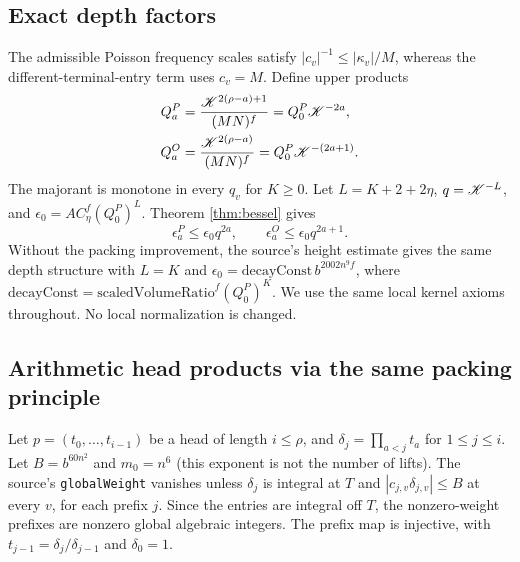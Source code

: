 \documentclass[11pt,a4paper]{article}
\begin{document}
\subsection{Exact depth factors}
The admissible Poisson frequency scales satisfy $|c_v|^{-1}\leq |\kappa_v|/M$, whereas the different-terminal-entry term uses $c_v=M$. Define upper products
\begin{align}
Q_a^P&=\frac{\mathscr K^{2(\rho-a)+1}}{(MN)^f}=Q_0^P\mathscr K^{-2a},\\
Q_a^O&=\frac{\mathscr K^{2(\rho-a)}}{(MN)^f}=Q_0^P\mathscr K^{-(2a+1)}.
\end{align}
The majorant is monotone in every $q_v$ for $K\geq0$. Let $L=K+2+2\eta$, $q=\mathscr K^{-L}$, and $\epsilon_0=A C_\eta^f(Q_0^P)^L$. Theorem \ref{thm:bessel} gives
\begin{equation}\label{eq:depth}
\epsilon_a^P\leq\epsilon_0q^{2a},\qquad \epsilon_a^O\leq\epsilon_0q^{2a+1}.
\end{equation}
Without the packing improvement, the source's height estimate gives the same depth structure with $L=K$ and $\epsilon_0=\mathrm{decayConst}\,b^{2002n^9f}$, where $\mathrm{decayConst}=\mathrm{scaledVolumeRatio}^f(Q_0^P)^K$. We use the same local kernel axioms throughout. No local normalization is changed.

\subsection{Arithmetic head products via the same packing principle}
Let $p=(t_0,\ldots,t_{i-1})$ be a head of length $i\leq\rho$, and $\delta_j=\prod_{a<j}t_a$ for $1\leq j\leq i$. Let $B=b^{60n^2}$ and $m_0=n^6$ (this exponent is not the number of lifts). The source's \texttt{globalWeight} vanishes unless $\delta_j$ is integral at $T$ and $|c_{j,v}\delta_{j,v}|\leq B$ at every $v$, for each prefix $j$. Since the entries are integral off $T$, the nonzero-weight prefixes are nonzero global algebraic integers. The prefix map is injective, with $t_{j-1}=\delta_j/\delta_{j-1}$ and $\delta_0=1$.
\end{document}
